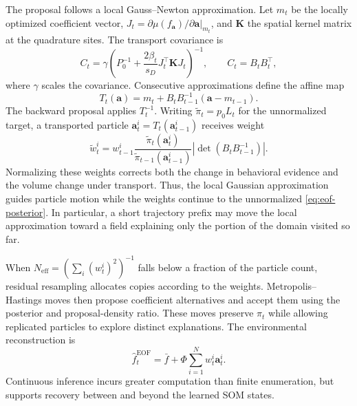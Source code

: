 \documentclass[letterpaper,10pt,conference]{ieeeconf}
\begin{document}
The proposal follows a local Gauss--Newton approximation. Let $m_t$ be the locally optimized coefficient vector, $J_t=\partial\mu(f_{\boldsymbol a})/\partial\boldsymbol a|_{m_t}$, and $\mathbf K$ the spatial kernel matrix at the quadrature sites. The transport covariance is
\begin{equation}
  C_t=\gamma\left(P_0^{-1}+\frac{2\beta_t}{s_D}J_t^\top \mathbf KJ_t\right)^{-1},
  \qquad C_t=B_tB_t^\top,
  \label{eq:proposal-covariance}
\end{equation}
where $\gamma$ scales the covariance. Consecutive approximations define the affine map
\begin{equation}
  T_t(\boldsymbol a)=m_t+B_tB_{t-1}^{-1}(\boldsymbol a-m_{t-1}).
  \label{eq:transport}
\end{equation}
The backward proposal applies $T_t^{-1}$. Writing $\widetilde\pi_t=p_0L_t$ for the unnormalized target, a transported particle $\boldsymbol a_t^i=T_t(\boldsymbol a_{t-1}^i)$ receives weight
\begin{equation}
 \widetilde w_t^i=w_{t-1}^i
 \frac{\widetilde\pi_t(\boldsymbol a_t^i)}
      {\widetilde\pi_{t-1}(\boldsymbol a_{t-1}^i)}
 \left|\det(B_tB_{t-1}^{-1})\right|.
 \label{eq:transport-weight}
\end{equation}
Normalizing these weights corrects both the change in behavioral evidence and the volume change under transport. Thus, the local Gaussian approximation guides particle motion while the weights continue to  the unnormalized \eqref{eq:eof-posterior}. In particular, a short trajectory prefix may move the local approximation toward a field explaining only the portion of the domain visited so far.

When $N_{\mathrm{eff}}=(\sum_i(w_t^i)^2)^{-1}$ falls below a fraction of the particle count, residual resampling allocates copies according to the weights. Metropolis--Hastings moves then propose coefficient alternatives and accept them using the posterior and proposal-density ratio. These moves preserve $\pi_t$ while allowing replicated particles to explore distinct explanations. The environmental reconstruction is
\begin{equation}
 \widehat f_t^{\mathrm{EOF}}=\bar f+\Phi\sum_{i=1}^{N}w_t^i\boldsymbol a_t^i.
\end{equation}
Continuous inference incurs greater computation than finite enumeration, but supports recovery between and beyond the learned SOM states.
\end{document}
